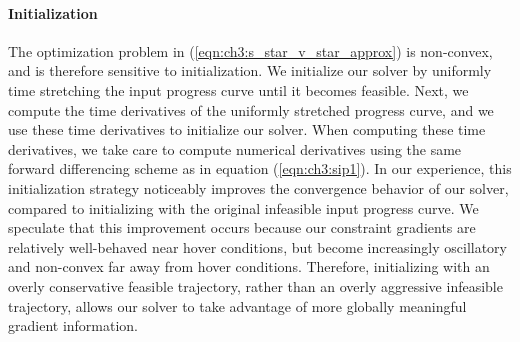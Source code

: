 \paragraph{Initialization}

The optimization problem in (\ref{eqn:ch3:s_star_v_star_approx}) is non-convex, and is therefore sensitive to initialization.
We initialize our solver by uniformly time stretching the input progress curve until it becomes feasible.
Next, we compute the time derivatives of the uniformly stretched progress curve, and we use these time derivatives to initialize our solver.
When computing these time derivatives, we take care to compute numerical derivatives using the same forward differencing scheme as in equation (\ref{eqn:ch3:sip1}).
In our experience, this initialization strategy noticeably improves the convergence behavior of our solver, compared to initializing with the original infeasible input progress curve.
We speculate that this improvement occurs because our constraint gradients are relatively well-behaved near hover conditions, but become increasingly oscillatory and non-convex far away from hover conditions.
Therefore, initializing with an overly conservative feasible trajectory, rather than an overly aggressive infeasible trajectory, allows our solver to take advantage of more globally meaningful gradient information.

